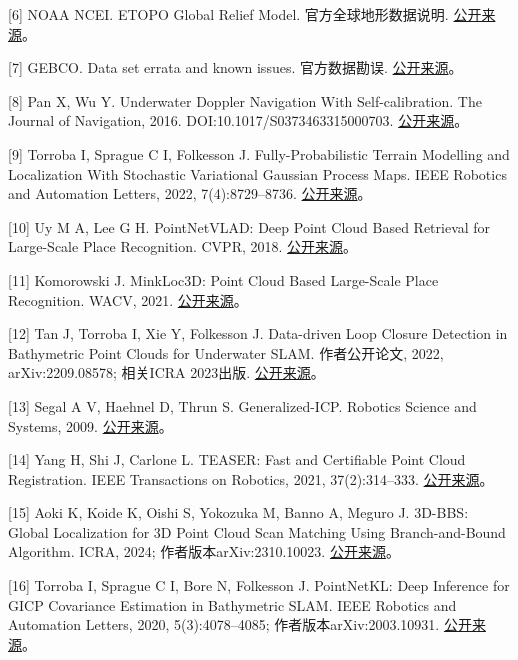 {[}6{]} NOAA NCEI. ETOPO Global Relief Model. 官方全球地形数据说明. \href{https://www.ncei.noaa.gov/products/etopo-global-relief-model}{公开来源}。

{[}7{]} GEBCO. Data set errata and known issues. 官方数据勘误. \href{https://www.gebco.net/data-products/gridded-bathymetry-data/data-set-errata}{公开来源}。

{[}8{]} Pan X, Wu Y. Underwater Doppler Navigation With Self-calibration. The Journal of Navigation, 2016. DOI:10.1017/S0373463315000703. \href{https://arxiv.org/abs/1509.02054}{公开来源}。

{[}9{]} Torroba I, Sprague C I, Folkesson J. Fully-Probabilistic Terrain Modelling and Localization With Stochastic Variational Gaussian Process Maps. IEEE Robotics and Automation Letters, 2022, 7(4):8729--8736. \href{https://arxiv.org/abs/2203.10893}{公开来源}。

{[}10{]} Uy M A, Lee G H. PointNetVLAD: Deep Point Cloud Based Retrieval for Large-Scale Place Recognition. CVPR, 2018. \href{https://arxiv.org/abs/1804.03492}{公开来源}。

{[}11{]} Komorowski J. MinkLoc3D: Point Cloud Based Large-Scale Place Recognition. WACV, 2021. \href{https://arxiv.org/abs/2011.04530}{公开来源}。

{[}12{]} Tan J, Torroba I, Xie Y, Folkesson J. Data-driven Loop Closure Detection in Bathymetric Point Clouds for Underwater SLAM. 作者公开论文, 2022, arXiv:2209.08578; 相关ICRA 2023出版. \href{https://arxiv.org/abs/2209.08578}{公开来源}。

{[}13{]} Segal A V, Haehnel D, Thrun S. Generalized-ICP. Robotics Science and Systems, 2009. \href{https://www.robots.ox.ac.uk/~avsegal/resources/papers/Generalized_ICP.pdf}{公开来源}。

{[}14{]} Yang H, Shi J, Carlone L. TEASER: Fast and Certifiable Point Cloud Registration. IEEE Transactions on Robotics, 2021, 37(2):314--333. \href{https://arxiv.org/abs/2001.07715}{公开来源}。

{[}15{]} Aoki K, Koide K, Oishi S, Yokozuka M, Banno A, Meguro J. 3D-BBS: Global Localization for 3D Point Cloud Scan Matching Using Branch-and-Bound Algorithm. ICRA, 2024; 作者版本arXiv:2310.10023. \href{https://arxiv.org/abs/2310.10023}{公开来源}。

{[}16{]} Torroba I, Sprague C I, Bore N, Folkesson J. PointNetKL: Deep Inference for GICP Covariance Estimation in Bathymetric SLAM. IEEE Robotics and Automation Letters, 2020, 5(3):4078--4085; 作者版本arXiv:2003.10931. \href{https://arxiv.org/abs/2003.10931}{公开来源}。

